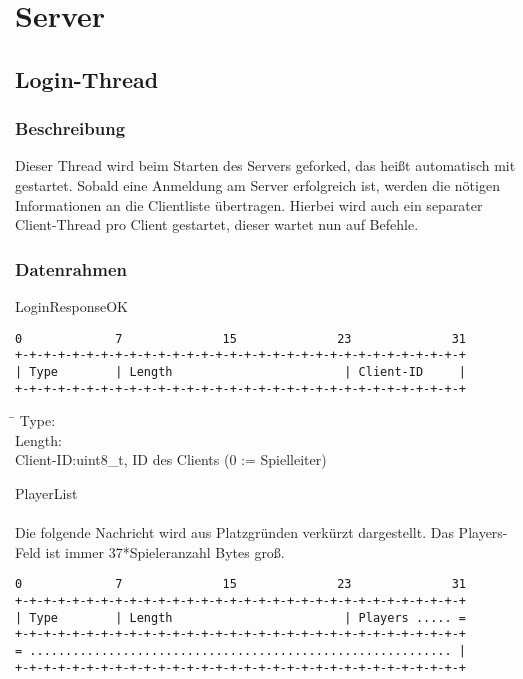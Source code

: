 \documentclass[a4paper,10pt]{article}
\begin{document}
\newpage

\section{Server}

\subsection{Login-Thread}

\subsubsection{Beschreibung}

Dieser Thread wird beim Starten des Servers geforked, das heißt automatisch mit gestartet. 
Sobald eine Anmeldung am Server erfolgreich ist, werden die nötigen Informationen an die Clientliste übertragen. 
Hierbei wird auch ein separater Client-Thread pro Client gestartet, dieser wartet nun auf Befehle.

\subsubsection{Datenrahmen}

LoginResponseOK

\begin{Verbatim}[fontfamily=courier]
 0             7              15              23              31
+-+-+-+-+-+-+-+-+-+-+-+-+-+-+-+-+-+-+-+-+-+-+-+-+-+-+-+-+-+-+-+
| Type        | Length                        | Client-ID     |
+-+-+-+-+-+-+-+-+-+-+-+-+-+-+-+-+-+-+-+-+-+-+-+-+-+-+-+-+-+-+-+
\end{Verbatim}

\begin{tabbing}
 \hspace{2 cm}\=\kill
Type:\\
Length:\\
Client-ID:\>uint8\_t, ID des Clients (0 := Spielleiter)
\end{tabbing}

$~~$ \\PlayerList\\ \\
Die folgende Nachricht wird aus Platzgründen verkürzt dargestellt. Das
Players-Feld ist immer 37*Spieleranzahl Bytes groß.

\begin{Verbatim}[fontfamily=courier]
0             7              15              23              31
+-+-+-+-+-+-+-+-+-+-+-+-+-+-+-+-+-+-+-+-+-+-+-+-+-+-+-+-+-+-+-+
| Type        | Length                        | Players ..... =
+-+-+-+-+-+-+-+-+-+-+-+-+-+-+-+-+-+-+-+-+-+-+-+-+-+-+-+-+-+-+-+
= ........................................................... |
+-+-+-+-+-+-+-+-+-+-+-+-+-+-+-+-+-+-+-+-+-+-+-+-+-+-+-+-+-+-+-+
\end{Verbatim}
\end{document}
